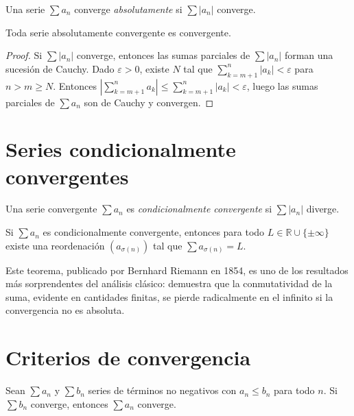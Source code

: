 \begin{definition}
\label{def:absoluta}
Una serie $\sum a_n$ converge \emph{absolutamente} si $\sum|a_n|$ converge.
\end{definition}

\begin{theorem}
\label{teo:absoluta-implica-convergencia}
Toda serie absolutamente convergente es convergente.
\end{theorem}
\begin{proof}
Si $\sum|a_n|$ converge, entonces las sumas parciales de $\sum|a_n|$ forman una sucesión de Cauchy. Dado $\varepsilon>0$, existe $N$ tal que $\sum_{k=m+1}^{n}|a_k|<\varepsilon$ para $n>m\geq N$. Entonces $|\sum_{k=m+1}^{n}a_k|\leq\sum_{k=m+1}^{n}|a_k|<\varepsilon$, luego las sumas parciales de $\sum a_n$ son de Cauchy y convergen.
\end{proof}

\section{Series condicionalmente convergentes}

\begin{definition}
\label{def:condicional}
Una serie convergente $\sum a_n$ es \emph{condicionalmente convergente} si $\sum|a_n|$ diverge.
\end{definition}

\begin{theorem}[Riemann]
\label{teo:riemann}
Si $\sum a_n$ es condicionalmente convergente, entonces para todo $L\in\mathbb{R}\cup\{\pm\infty\}$ existe una reordenación $(a_{\sigma(n)})$ tal que $\sum a_{\sigma(n)}=L$.
\end{theorem}

Este teorema, publicado por Bernhard Riemann en 1854, es uno de los resultados más sorprendentes del análisis clásico: demuestra que la conmutatividad de la suma, evidente en cantidades finitas, se pierde radicalmente en el infinito si la convergencia no es absoluta.

\section{Criterios de convergencia}

\begin{theorem}
\label{teo:comparacion-series}
Sean $\sum a_n$ y $\sum b_n$ series de términos no negativos con $a_n\leq b_n$ para todo $n$. Si $\sum b_n$ converge, entonces $\sum a_n$ converge.
\end{theorem}

